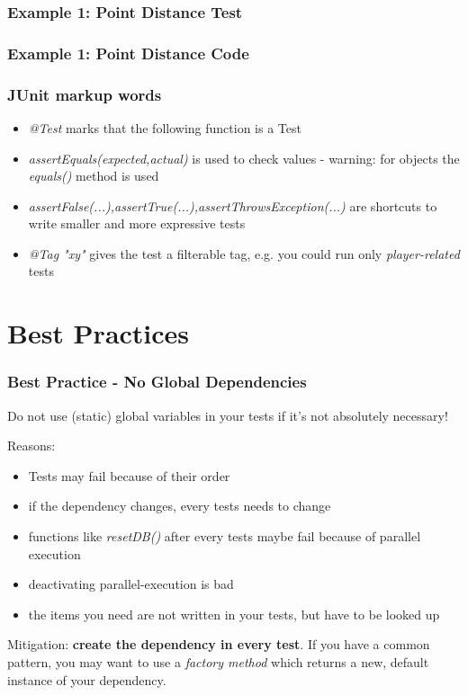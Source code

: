 \documentclass[12pt]{beamer}
\begin{document}
	\begin{frame}
		\frametitle{Example 1: Point Distance Test}
	\end{frame}
	
	\begin{frame}
		\frametitle{Example 1: Point Distance Code}
	\end{frame}
	
	\begin{frame}
		\frametitle{JUnit markup words}
		\begin{itemize}
			\item \textit{@Test} marks that the following function is a Test
			\item \textit{assertEquals(expected,actual)} is used to check values - warning: for objects the \textit{equals()} method is used 
			\item \textit{assertFalse(...),assertTrue(...),assertThrowsException(...)} are shortcuts to write smaller and more expressive tests
			\item \textit{@Tag "xy"} gives the test a filterable tag, e.g. you could run only \textit{player-related} tests
		\end{itemize}
	\end{frame}

	\section{Best Practices}

	\begin{frame}
		\frametitle{Best Practice - No Global Dependencies}
		Do not use (static) global variables in your tests if it's not absolutely necessary! 
		
		Reasons: 
		\begin{itemize}
			\item Tests may fail because of their order
			\item if the dependency changes, every tests needs to change
			\item functions like \textit{resetDB()} after every tests maybe fail because of parallel execution
			\item deactivating parallel-execution is bad
			\item the items you need are not written in your tests, but have to be looked up
		\end{itemize}
	
		Mitigation: \textbf{create the dependency in every test}. If you have a common pattern, you may want to use a \textit{factory method} which returns a new, default instance of your  dependency.
	\end{frame}
	
\end{document}
